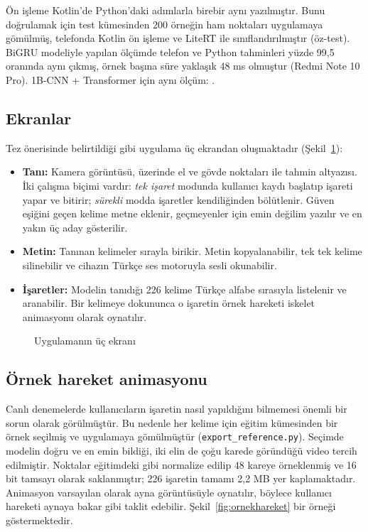 Ön işleme Kotlin'de Python'daki adımlarla birebir aynı yazılmıştır. Bunu doğrulamak
için test kümesinden 200 örneğin ham noktaları uygulamaya gömülmüş, telefonda Kotlin
ön işleme ve LiteRT ile sınıflandırılmıştır (öz-test). BiGRU modeliyle yapılan ölçümde
telefon ve Python tahminleri yüzde 99,5 oranında aynı çıkmış, örnek başına süre
yaklaşık 48 ms olmuştur (Redmi Note 10 Pro). 1B-CNN + Transformer için aynı ölçüm:
.

\subsection{Ekranlar}

Tez önerisinde belirtildiği gibi uygulama üç ekrandan oluşmaktadır
(Şekil~\ref{fig:ekranlar}):

\begin{itemize}
  \item \textbf{Tanı:} Kamera görüntüsü, üzerinde el ve gövde noktaları ile tahmin
        altyazısı. İki çalışma biçimi vardır: \textit{tek işaret} modunda kullanıcı kaydı
        başlatıp işareti yapar ve bitirir; \textit{sürekli} modda işaretler kendiliğinden
        bölütlenir. Güven eşiğini geçen kelime metne eklenir, geçmeyenler için
        \sol emin değilim\sag{} yazılır ve en yakın üç aday gösterilir.
  \item \textbf{Metin:} Tanınan kelimeler sırayla birikir. Metin kopyalanabilir,
        tek tek kelime silinebilir ve cihazın Türkçe ses motoruyla sesli okunabilir.
  \item \textbf{İşaretler:} Modelin tanıdığı 226 kelime Türkçe alfabe sırasıyla
        listelenir ve aranabilir. Bir kelimeye dokununca o işaretin örnek hareketi
        iskelet animasyonu olarak oynatılır.
\end{itemize}

\begin{figure}[H]
\centering
{}
\caption{Uygulamanın üç ekranı}
\label{fig:ekranlar}
\end{figure}

\subsection{Örnek hareket animasyonu}

Canlı denemelerde kullanıcıların işaretin nasıl yapıldığını bilmemesi önemli bir
sorun olarak görülmüştür. Bu nedenle her kelime için eğitim kümesinden bir örnek
seçilmiş ve uygulamaya gömülmüştür (\texttt{export\_reference.py}). Seçimde modelin
doğru ve en emin bildiği, iki elin de çoğu karede göründüğü video tercih edilmiştir.
Noktalar eğitimdeki gibi normalize edilip 48 kareye örneklenmiş ve 16 bit tamsayı
olarak saklanmıştır; 226 işaretin tamamı 2,2 MB yer kaplamaktadır. Animasyon varsayılan
olarak ayna görüntüsüyle oynatılır, böylece kullanıcı hareketi aynaya bakar gibi taklit
edebilir. Şekil~\ref{fig:ornekhareket} bir örneği göstermektedir.


